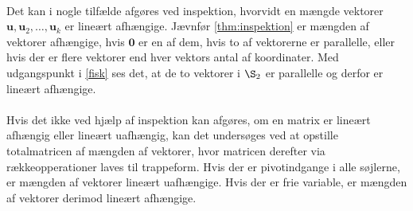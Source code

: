 \\
%
%
Det kan i nogle tilfælde afgøres ved inspektion, hvorvidt en mængde vektorer $\mathbf{u},\mathbf{u}_2,\ldots ,\mathbf{u}_k$ er lineært afhængige. 
Jævnfør \ref{thm:inspektion} er mængden af vektorer afhængige, hvis $\mathbf{0}$ er en af dem, hvis to af vektorerne er parallelle, eller hvis der er flere vektorer end hver vektors antal af koordinater. 
Med udgangspunkt i \ref{fisk} ses det, at de to vektorer i $\S_2$ er parallelle og derfor er lineært afhængige. 
\\\\
Hvis det ikke ved hjælp af inspektion kan afgøres, om en matrix er lineært afhængig eller lineært uafhængig, kan det undersøges ved at opstille totalmatricen af mængden af vektorer, hvor matricen derefter via rækkeopperationer laves til trappeform. 
Hvis der er pivotindgange i alle søjlerne, er mængden af vektorer lineært uafhængige. Hvis der er frie variable, er mængden af vektorer derimod lineært afhængige.
\\\\
%
